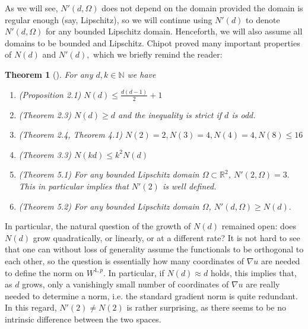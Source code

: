 \documentclass[11pt, a4paper, reqno]{elsarticle}
\newtheorem{theorem}{Theorem}[section]
\theoremstyle{definition}
\theoremstyle{remark}
\begin{document}
As we will see, $N'(d,\Omega)$ does not depend on the domain provided the domain is regular enough (say, Lipschitz), so we will continue using $N'(d)$
to denote $N'(d,\Omega)$ for any bounded Lipschitz domain. Henceforth, we will
also assume all domains to be bounded and Lipschitz.
Chipot proved many important properties 
of $N(d)$ and $N'(d),$ which we briefly 
remind the reader:
\begin{theorem}[{\cite{Chipot2021OnType}}] For any $d,k\in\mathbb{N}$ we have
\begin{enumerate}
    \item (Proposition 2.1) $N(d)\le \frac{d(d-1)}2+1$
    \item (Theorem 2.3) $N(d)\ge d$ and the inequality
        is strict if $d$ is odd.
    \item (Theorem 2.4, Theorem 4.1) $N(2)=2, N(3)=4, N(4)=4,  N(8)\le 16$
    \item (Theorem 3.3) $N(kd)\le k^2 N(d)$
    \item (Theorem 5.1) For any bounded Lipschitz domain $\Omega\subset \mathbb{R}^2$, $N'(2, \Omega)=3.$ This in particular implies that $N'(2)$ is well defined.
    \item (Theorem 5.2) For any bounded Lipschitz domain $\Omega$, $N'(d,\Omega)\ge N(d).$
\end{enumerate}
\end{theorem}
In particular, the natural question of the
growth of $N(d)$ remained open: does $N(d)$ grow quadratically, or linearly,
or at a different rate?
It is not hard to 
see that one can 
without loss of generality
assume the functionals to 
be orthogonal to each other, so the question is 
essentially how many coordinates of $\nabla u$ are needed to define
the norm on $W^{1,p}$.
In particular, if $N(d)\approx d$ holds, 
this implies that, as $d$
grows, only a vanishingly small number of coordinates
of $\nabla u$ are really
needed to determine a norm,
i.e. the standard gradient norm is quite redundant.
In this regard, $N'(2)\neq N(2)$ is rather surprising,
as there seems to be no
intrinsic difference between the two spaces.
\end{document}
